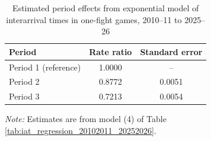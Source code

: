 \begin{table}[!h]
\centering
\caption{Estimated period effects from exponential model of interarrival times in one-fight games, 2010--11 to 2025--26}
\label{tab:period_effects_20102011_20252026}

\begin{tabular}{lcc}
\toprule
Period & Rate ratio & Standard error \\
\midrule
Period 1 (reference) & 1.0000 & -- \\
Period 2 & 0.8772 & 0.0051 \\
Period 3 & 0.7213 & 0.0054 \\
\bottomrule
\end{tabular}

\vspace{0.4em}
\parbox{0.95\textwidth}{
\footnotesize
\textit{Note:} Estimates are from model (4) of Table \ref{tab:iat_regression_20102011_20252026}.
}
\end{table}
